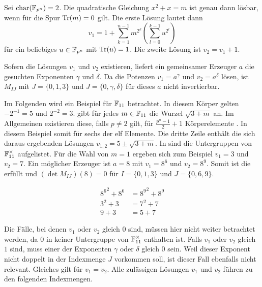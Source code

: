 \begin{lemma}
    Sei $\charac(\field{p}[n]) = 2$. Die quadratische Gleichung $x^2 + x = m$ ist genau dann lösbar, wenn für die Spur $\mathrm{Tr}(m) = 0$ gilt. Die erste Lösung lautet dann
    \begin{equation*}
        v_1 = 1 + \sum_{k=1}^{n-1} m^{2^k}(\sum_{l=0}^{k-1} u^{2^l})
    \end{equation*}
     für ein beliebiges $u \in \field{p}[n]$ mit $\mathrm{Tr}(u) = 1$. Die zweite Lösung ist $v_2 = v_1 + 1$.
\end{lemma}

Sofern die Lösungen $v_1$ und $v_2$ existieren, liefert ein gemeinsamer Erzeuger $a$ die gesuchten Exponenten $\gamma$ und $\delta$. Da die Potenzen $v_1 = a^\gamma$ und $v_2 = a^\delta$  lösen, ist $M_{IJ}$ mit $J = \{0,1,3\}$ und $J = \{0,\gamma,\delta\}$ für dieses $a$ nicht invertierbar.

\sloppy Im Folgenden wird ein Beispiel für $\field{11}$ betrachtet. In diesem Körper gelten ${-2^{-1} = 5}$ und $2^{-2} = 3$.  gibt für jedes $m \in \field{11}$ die Wurzel $\sqrt{3 + m}$ an. Im Allgemeinen existieren diese, falls $p \neq 2$ gilt, für $\frac{p^n-1}{2} + 1$ Körperelemente \cite{RootsFiniteFields}. In diesem Beispiel somit für sechs der elf Elemente. Die dritte Zeile enthält die sich daraus ergebenden Lösungen $v_{1,2} = 5 \pm \sqrt{3+m}$.
In  sind die Untergruppen von $\field{11}^\times$ aufgelistet. Für die Wahl von $m=1$ ergeben sich zum Beispiel $v_1 = 3$ und $v_2 = 7$. Ein möglicher Erzeuger ist $a = 8$ mit $v_1 = 8^6$ und $v_2 = 8^9$. Somit ist die  erfüllt und $(\det M_{IJ})(8) = 0$ für $I = \{0,1,3\}$ und $J = \{0,6,9\}$.

\begin{align*}
    {8^6}^2 + 8^6 &= {8^{9}}^2 + 8^9 \\
    3^2 + 3 &= 7^2 + 7 \\
    9 + 3 &= 5 + 7
\end{align*}

Die Fälle, bei denen $v_1$ oder $v_2$ gleich 0 sind, müssen hier nicht weiter betrachtet werden, da $0$ in keiner Untergruppe von $\field{11}^\times$ enthalten ist. Falls $v_1$ oder $v_2$ gleich $1$ sind, muss einer der Exponenten $\gamma$ oder $\delta$ gleich $0$ sein. Weil dieser Exponent nicht doppelt in der Indexmenge $J$ vorkommen soll, ist dieser Fall ebenfalls nicht relevant. Gleiches gilt für $v_1 = v_2$. Alle zulässigen Lösungen $v_1$ und $v_2$ führen zu den folgenden Indexmengen.

